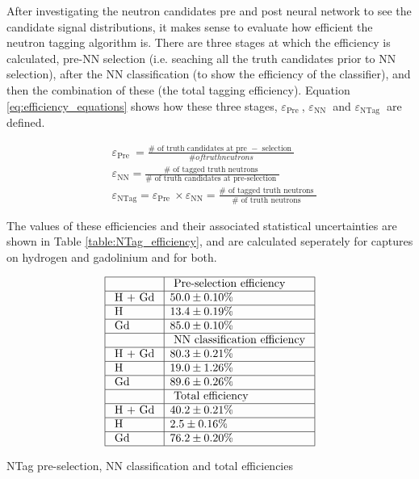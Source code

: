 After investigating the neutron candidates pre and post neural network to see the candidate signal distributions, it makes sense to evaluate how efficient the neutron tagging algorithm is. There are three stages at which the efficiency is calculated, pre-NN selection (i.e. seaching all the truth candidates prior to NN selection), after the NN classification (to show the efficiency of the classifier), and then the combination of these (the total tagging efficiency). Equation \ref{eq:efficiency_equations} shows how these three stages, $\varepsilon_{\text {Pre }}$, $\varepsilon_{\text {NN }}$ and $\varepsilon_{\text {NTag }}$ are defined.

\begin{equation}
\begin{aligned}
    & \varepsilon_{\text {Pre }}=\frac{\# \text { of truth candidates at pre }-\text { selection }}{\# of truth neutrons} \\
    & \varepsilon_{\mathrm{NN}}=\frac{\# \text { of tagged truth neutrons }}{\# \text { of truth candidates at pre-selection }} \\
    & \varepsilon_{\mathrm{NTag}}=\varepsilon_{\text {Pre }} \times \varepsilon_{\mathrm{NN}}=\frac{\# \text { of tagged truth neutrons }}{\# \text { of truth neutrons }}
\end{aligned}
\label{eq:efficiency_equations}
\end{equation}

The values of these efficiencies and their associated statistical uncertainties are shown in Table \ref{table:NTag_efficiency}, and are calculated seperately for captures on hydrogen and gadolinium and for both. 

\begin{table}
    $$
    \begin{array}{|l|l|}
    \hline & \text { Pre-selection efficiency } \\
    \hline \text { H + Gd } &50.0 \pm 0.10 \% \\
    \hline \text{ H } & 13.4 \pm 0.19 \% \\
    \hline \text { Gd } & 85.0 \pm 0.10 \% \\
    \hline & \text { NN classification efficiency } \\
    \hline \text { H + Gd } & 80.3 \pm 0.21 \% \\
    \hline \text { H } & 19.0 \pm 1.26 \% \\
    \hline \text { Gd } & 89.6 \pm 0.26 \% \\
    \hline & \text { Total efficiency } \\
    \hline \text { H + Gd } & 40.2 \pm 0.21 \% \\
    \hline \text { H } & 2.5 \pm 0.16 \% \\
    \hline \text { Gd } & 76.2 \pm 0.20 \% \\
    \hline
    \end{array}
    $$
    \caption{NTag pre-selection, NN classification and total efficiencies}
    \label{table:NTag_efficiency}
\end{table}

